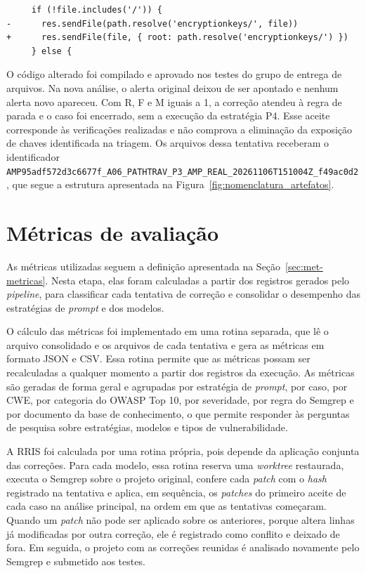 {\footnotesize
\begin{verbatim}
     if (!file.includes('/')) {
-      res.sendFile(path.resolve('encryptionkeys/', file))
+      res.sendFile(file, { root: path.resolve('encryptionkeys/') })
     } else {
\end{verbatim}
}

O código alterado foi compilado e aprovado nos testes do grupo de entrega de arquivos. Na nova análise, o alerta original deixou de ser apontado e nenhum alerta novo apareceu. Com R, F e M iguais a 1, a correção atendeu à regra de parada e o caso foi encerrado, sem a execução da estratégia P4. Esse aceite corresponde às verificações realizadas e não comprova a eliminação da exposição de chaves identificada na triagem. Os arquivos dessa tentativa receberam o identificador \texttt{AMP95adf572d3c6677f\_\allowbreak A06\_\allowbreak PATHTRAV\_\allowbreak P3\_\allowbreak AMP\_\allowbreak REAL\_\allowbreak 20261106T151004Z\_\allowbreak f49ac0d2}, que segue a estrutura apresentada na Figura~\ref{fig:nomenclatura_artefatos}.

\section{Métricas de avaliação}
\label{sec:impl-metricas}

As métricas utilizadas seguem a definição apresentada na Seção~\ref{sec:met-metricas}. Nesta etapa, elas foram calculadas a partir dos registros gerados pelo \textit{pipeline}, para classificar cada tentativa de correção e consolidar o desempenho das estratégias de \textit{prompt} e dos modelos.

O cálculo das métricas foi implementado em uma rotina separada, que lê o arquivo consolidado e os arquivos de cada tentativa e gera as métricas em formato JSON e CSV. Essa rotina permite que as métricas possam ser recalculadas a qualquer momento a partir dos registros da execução. As métricas são geradas de forma geral e agrupadas por estratégia de \textit{prompt}, por caso, por CWE, por categoria do OWASP Top 10, por severidade, por regra do Semgrep e por documento da base de conhecimento, o que permite responder às perguntas de pesquisa sobre estratégias, modelos e tipos de vulnerabilidade.

A RRIS foi calculada por uma rotina própria, pois depende da aplicação conjunta das correções. Para cada modelo, essa rotina reserva uma \textit{worktree} restaurada, executa o Semgrep sobre o projeto original, confere cada \textit{patch} com o \textit{hash} registrado na tentativa e aplica, em sequência, os \textit{patches} do primeiro aceite de cada caso na análise principal, na ordem em que as tentativas começaram. Quando um \textit{patch} não pode ser aplicado sobre os anteriores, porque altera linhas já modificadas por outra correção, ele é registrado como conflito e deixado de fora. Em seguida, o projeto com as correções reunidas é analisado novamente pelo Semgrep e submetido aos testes.

